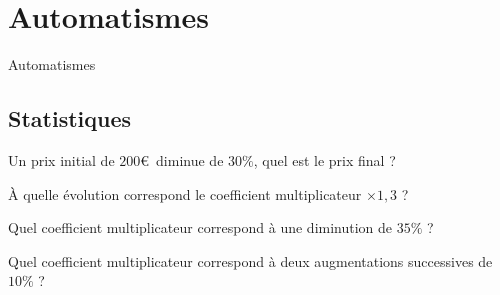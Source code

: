 \documentclass[14pt]{beamer}
\begin{document}
\section{Automatismes}

\begin{frame}

\centering \huge
Automatismes

\end{frame}

\subsection{Statistiques}

\begin{frame}{1}
	\centering
	Un prix initial de $200$\euro\, diminue de $30\%$, quel est le prix final ?
\end{frame}

\begin{frame}{2}
	\centering
	À quelle évolution correspond le coefficient multiplicateur $\times 1,3$ ?
\end{frame}

\begin{frame}{3}
	\centering
	Quel coefficient multiplicateur correspond à une diminution de $35\%$ ? 
\end{frame}

\begin{frame}{4}
	\centering
	Quel coefficient multiplicateur correspond à deux augmentations successives de $10\%$ ?
\end{frame}
\end{document}
